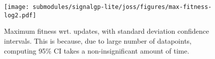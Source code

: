 \begin{figure}[h]

\centering
\texttt{[image: submodules/signalgp-lite/joss/figures/max-fitness-log2.pdf]}

\caption{%
Maximum fitness wrt. updates, with standard deviation confidence intervals.
This is because, due to large number of datapoints, computing 95\% CI takes a non-insignificant amount of time.
} \label{fig:max-fitness-sd}

\end{figure}
